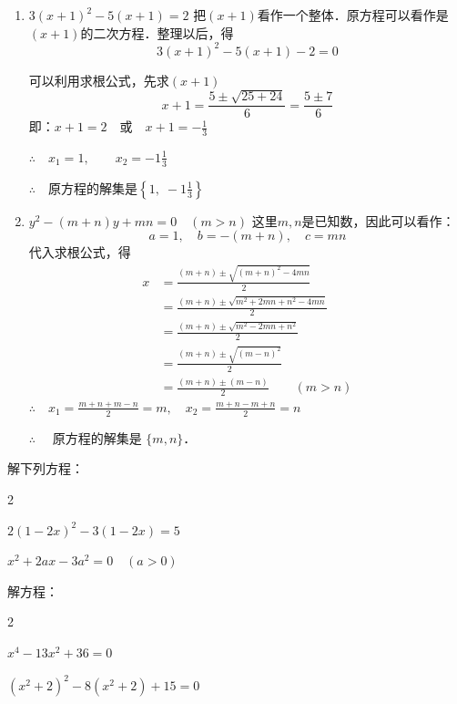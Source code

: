 \begin{solution}
\begin{enumerate}
    \item $3(x+1)^2-5(x+1)=2$
    把$(x+1)$看作一个整体．原方程可以看作是
    $(x+1)$的二次方程．整理以后，得
   \[3(x+1)^2-5(x+1)-2=0\] 

   可以利用求根公式，先求$(x+1)$
\[x+1=\frac{5\pm \sqrt{25+24}}{6}=\frac{5\pm 7}{6}\]
即：$x+1=2\quad \text{或}\quad x+1=-\frac{1}{3}$

$\therefore\quad x_1=1,\qquad x_2=-1\frac{1}{3}$

$\therefore\quad$原方程的解集是$\left\{1,\; -1\frac{1}{3}\right\}$

\item $y^2-(m+n)y+mn=0\quad (m>n)$
这里$m,n$是已知数，因此可以看作：
\[a=1,\quad b=-(m+n),\quad c=mn\]
代入求根公式，得
\[\begin{split}
        x &=\frac{(m+n) \pm \sqrt{(m+n)^{2}-4 m n}}{2} \\
        &=\frac{(m+n) \pm \sqrt{m^{2}+2 m n+n^{2}-4 m n}}{2} \\
        &=\frac{(m+n) \pm \sqrt{m^{2}-2 m n+n^{2}}}{2} \\
        &=\frac{(m+n) \pm \sqrt{(m-n)^{2}}}{2}\\
        &=\frac{(m+n) \pm(m-n)}{2} \qquad (m>n)
\end{split}\]
$\therefore\quad x_1=\frac{m+n+m-n}{2}=m,\quad x_2=\frac{m+n-m+n}{2}=n$

$\therefore\quad $ 原方程的解集是 $\{m,n\}$．
    \end{enumerate}
\end{solution}

\begin{ex}
    解下列方程：
    \begin{enumerate}
        \begin{multicols}{2}
            \item $2(1-2x)^2-3(1-2x)=5$
        \item $x^2+2ax-3a^2=0\quad  (a>0)$
        \end{multicols}
    \end{enumerate}
\end{ex}


\begin{example}
    解方程：
\begin{enumerate}
    \begin{multicols}{2}
          \item $x^4-13x^2+36=0$
    \item $(x^2+2)^2-8(x^2+2)+15=0$
    \end{multicols}
\end{enumerate}
\end{example}

